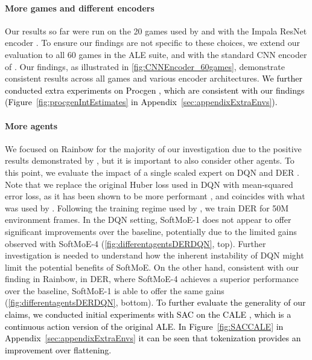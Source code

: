 \documentclass{article} %
\newcommand{\rebuttal}[1]{\textcolor{black}{#1}}
\begin{document}
\paragraph{More games and different encoders} Our results so far were run on the 20 games used by \citet{ceron2024mixtures} and with the Impala ResNet encoder \citep{espeholt2018impala}. To ensure our findings are not specific to these choices, we extend our evaluation to all 60 games in the ALE suite, and with the standard CNN encoder of \citet{mnih2015human}. Our findings, as illustrated in \autoref{fig:CNNEncoder_60games}, demonstrate consistent results across all games and various encoder architectures.
\rebuttal{We further conducted extra experiments on Procgen \citep{cobbe2019procgen}, which are consistent with our findings (Figure~\ref{fig:procgenIntEstimates} in Appendix~\ref{sec:appendixExtraEnvs}).}

\paragraph{More agents} We focused on Rainbow for the majority of our investigation due to the positive results demonstrated by \citet{ceron2024mixtures}, but it is important to also consider other agents. To this point, we evaluate the impact of a single scaled expert on DQN \citep{mnih2015human} and DER \citep{van2019use}. Note that we replace the original Huber loss used in DQN with mean-squared error loss, as it has been shown to be more performant \citep{ceron2021revisiting}, and coincides with what was used by \citet{ceron2024mixtures}. Following the training regime used by \citet{ceron2024mixtures}, we train DER for 50M environment frames.
In the DQN setting, SoftMoE-1 does not appear to offer significant improvements over the baseline, potentially due to the limited gains observed with SoftMoE-4 (\autoref{fig:differentagentsDERDQN}, top). Further investigation is needed to understand how the inherent instability of DQN might limit the potential benefits of SoftMoE. On the other hand, consistent with our finding in Rainbow, in DER, where SoftMoE-4 achieves a superior performance over the baseline, SoftMoE-1 is able to offer the same gains (\autoref{fig:differentagentsDERDQN}, bottom).  \rebuttal{To further evaluate the generality of our claims, we conducted initial experiments with SAC \citep{haarnoja2018soft} on the CALE \citep{farebrother2024cale}, which is a continuous action version of the original ALE. In Figure~\ref{fig:SACCALE} in Appendix~\ref{sec:appendixExtraEnvs} it can be seen that tokenization provides an improvement over flattening.}
\end{document}
